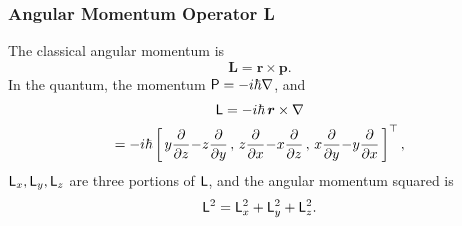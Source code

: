 \documentclass{article}
\newcommand{\ko}[1]{\hspace{-#1 pt}}%
\newcommand{\pd}[2]{\frac{\partial #1}{\partial #2}}%
\newcommand{\spd}[2]{\frac{\partial^2 #1}{\partial #2^2}}
\newcommand{\tpd}[3]{\frac{\partial^2 #1}{\partial #2\partial #3}}
\newcommand{\kh}[1]{\left(#1\right)}
\newcommand{\fkh}[1]{\left[#1\right]}
\begin{document}
\subsubsection{Angular Momentum Operator \textsf{L}}
The classical angular momentum is
$$\bm L=\bm r\times\bm p.$$
In the quantum, the momentum $\mathsf P=-i\hbar\nabla$, and
\begin{gather*}
	\sL=-i\hbar\,\bm r\times\nabla\\
	=-i\hbar\fkh{\,y\pd{}z\ko2-\ko2z\pd{}y\,,\,z\pd{}x\ko2-\ko2x\pd{}z\,,\,x\pd{}y\ko2-\ko2y\pd{}x\,}^\top,
\end{gather*}
$\mathsf L_x,\mathsf L_y,\mathsf L_z$ are three portions of $\mathsf L$, and the angular momentum squared is
$$\mathsf L^2=\mathsf L_x^2+\mathsf L_y^2+\mathsf L_z^2.$$
\iffalse
	Because
	\begin{align*}
		\sL_x^2 & =-\hbar^2\kh{y\pd{}z-z\pd{}y}\kh{y\pd{}z-z\pd{}y}                                       \\
		        & =-\hbar^2\kh{y^2\spd{}z-y\pd{}y-yz\tpd{}zy-z\pd{}z-yz\tpd{}yz+z^2\spd{}y}               \\
		\sL^2   & =-\hbar^2\left(y^2\spd{}z+z^2\spd{}y+z^2\spd{}x+x^2\spd{}z+z^2\spd{}y+y^2\spd{}z\right. \\
		        & \qquad\qquad-y\pd{}y-z\pd{}z-z\pd{}z-x\pd{}x-x\pd{}x-y\pd{}y                            \\
		        & \qquad\qquad\left.-2yz\tpd{}yz-2zx\tpd{}zx-2xy\tpd{}xy\right)
	\end{align*}
\fi
\end{document}
